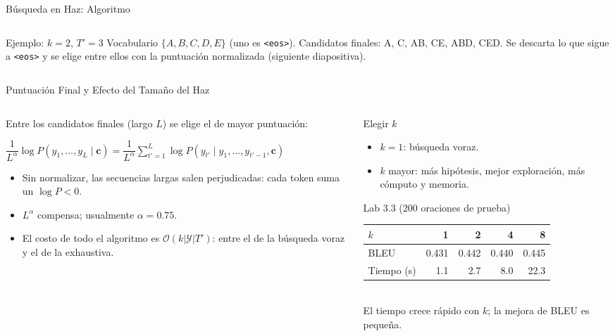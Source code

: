 \documentclass[aspectratio=169, 10pt]{beamer}
\newcommand{\tok}[1]{\texttt{#1}}
\newcommand{\eos}{\tok{<eos>}}
\newcommand{\formula}[1]{%
	\begin{tcolorbox}[colback=UCMBlue!8, colframe=UCMBlue, arc=4pt,
		boxsep=2pt, left=6pt, right=6pt, top=3pt, bottom=3pt]
		#1
	\end{tcolorbox}
}
\begin{document}
\begin{frame}[shrink]{B\'usqueda en Haz: Algoritmo}
\begin{columns}[T]
\begin{column}{0.47\textwidth}
			\vspace{0.1cm}
			\begin{block}{Ejemplo: $k=2$, $T'=3$}
				\scriptsize
				Vocabulario $\{A,B,C,D,E\}$ (uno es \eos). Candidatos finales: A, C, AB, CE, ABD, CED. Se descarta lo que sigue a \eos{} y se elige entre ellos con la puntuaci\'on normalizada (siguiente diapositiva).
			\end{block}
		\end{column}
	\end{columns}

\end{frame}

\begin{frame}[shrink]{Puntuaci\'on Final y Efecto del Tama\~no del Haz}

	\begin{columns}[T]
		\begin{column}{0.53\textwidth}
			\small
			Entre los candidatos finales (largo $L$) se elige el de mayor puntuaci\'on:
			\formula{\centering $\dfrac{1}{L^{\alpha}}\log P(y_1,\ldots,y_L\mid\mathbf{c}) = \dfrac{1}{L^{\alpha}}\displaystyle\sum_{t'=1}^{L}\log P(y_{t'}\mid y_1,\ldots,y_{t'-1},\mathbf{c})$}
			\begin{itemize}
				\item Sin normalizar, las secuencias largas salen perjudicadas: cada token suma un $\log P<0$.
				\item $L^{\alpha}$ compensa; usualmente $\alpha = 0.75$.
				\item El costo de todo el algoritmo es $\mathcal{O}(k|\mathcal{Y}|T')$: entre el de la b\'usqueda voraz y el de la exhaustiva.
			\end{itemize}
		\end{column}

		\begin{column}{0.44\textwidth}
			\begin{block}{Elegir $k$}
				\small
				\begin{itemize}
					\item $k=1$: b\'usqueda voraz.
					\item $k$ mayor: m\'as hip\'otesis, mejor exploraci\'on, m\'as c\'omputo y memoria.
				\end{itemize}
			\end{block}
			\begin{block}{Lab 3.3 (200 oraciones de prueba)}
				\scriptsize
				\begin{tabular}{@{}lrrrr@{}}
					\toprule
					$k$ & 1 & 2 & 4 & 8 \\
					\midrule
					BLEU & 0.431 & 0.442 & 0.440 & 0.445 \\
					Tiempo (s) & 1.1 & 2.7 & 8.0 & 22.3 \\
					\bottomrule
				\end{tabular}\\[2pt]
				El tiempo crece r\'apido con $k$; la mejora de BLEU es peque\~na.
			\end{block}
		\end{column}
	\end{columns}


\end{frame}
\end{document}
